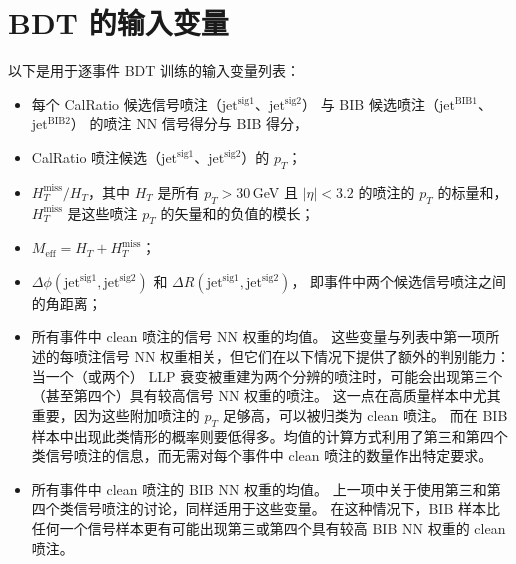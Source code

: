 
\chapter{BDT 的输入变量}
\label{cpm:BDT}

以下是用于逐事件 BDT 训练的输入变量列表：

\begin{itemize}
    \item 每个 CalRatio 候选信号喷注（$\text{jet}^{\text{sig}1}$、$\text{jet}^{\text{sig}2}$）
          与 BIB 候选喷注（$\text{jet}^{\text{BIB}1}$、$\text{jet}^{\text{BIB}2}$）
          的喷注 NN 信号得分与 BIB 得分，

    \item CalRatio 喷注候选（$\text{jet}^{\text{sig}1}$、$\text{jet}^{\text{sig}2}$）的 $p_T$；

    \item $H_T^{\text{miss}} / H_T$，其中 $H_T$ 是所有 $p_T > 30$\,GeV 且 $|\eta| < 3.2$ 的喷注的 $p_T$ 的标量和，
          $H_T^{\text{miss}}$ 是这些喷注 $p_T$ 的矢量和的负值的模长；

    \item $M_{\text{eff}} = H_T + H_T^{\text{miss}} $；

    \item $\Delta \phi (\text{jet}^{\text{sig}1}, \text{jet}^{\text{sig}2})$ 和
          $\Delta R(\text{jet}^{\text{sig}1}, \text{jet}^{\text{sig}2})$，
          即事件中两个候选信号喷注之间的角距离；

    \item 所有事件中 clean 喷注的信号 NN 权重的均值。
          这些变量与列表中第一项所述的每喷注信号 NN 权重相关，但它们在以下情况下提供了额外的判别能力：
          当一个（或两个） LLP 衰变被重建为两个分辨的喷注时，可能会出现第三个（甚至第四个）具有较高信号 NN 权重的喷注。
          这一点在高质量样本中尤其重要，因为这些附加喷注的 $p_T$ 足够高，可以被归类为 clean 喷注。
          而在 BIB 样本中出现此类情形的概率则要低得多。均值的计算方式利用了第三和第四个类信号喷注的信息，而无需对每个事件中 clean 喷注的数量作出特定要求。

    \item 所有事件中 clean 喷注的 BIB NN 权重的均值。
          上一项中关于使用第三和第四个类信号喷注的讨论，同样适用于这些变量。
          在这种情况下，BIB 样本比任何一个信号样本更有可能出现第三或第四个具有较高 BIB NN 权重的 clean 喷注。
\end{itemize}
